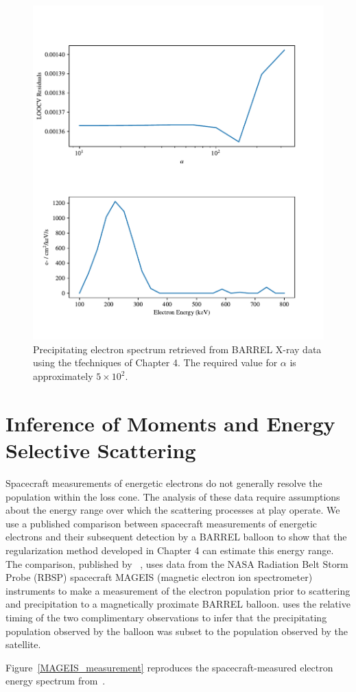 \begin{figure}[h]
    \centering
    \includegraphics[width=1.0\textwidth]{figures/chapter_5/barrel_tk_inv/barrel_tk_inv}
    \caption{Precipitating electron spectrum retrieved from BARREL X-ray data using the tfechniques of Chapter 4. The required value for $\alpha$ is approximately $5\times10^2$.}
    \label{barrel_tk_inv}
\end{figure}

\section{Inference of Moments and Energy Selective Scattering}

Spacecraft measurements of energetic electrons do not generally resolve the population within the loss cone. The analysis of these data require assumptions about the energy range over which the scattering processes at play operate. We use a published comparison between spacecraft measurements of energetic electrons and their subsequent detection by a BARREL balloon to show that the regularization method developed in Chapter 4 can estimate this energy range. The comparison, published by ~\citet{Halford2015}, uses data from the NASA Radiation Belt Storm Probe (RBSP) spacecraft MAGEIS (magnetic electron ion spectrometer) instruments to make a measurement of the electron population prior to scattering and precipitation to a magnetically proximate BARREL balloon. \citet{Halford2015} uses the relative timing of the two complimentary observations to infer that the precipitating population observed by the balloon was subset to the population observed by the satellite.

Figure~\ref{MAGEIS_measurement} reproduces the spacecraft-measured electron energy spectrum from~\citet{Halford2015}.



